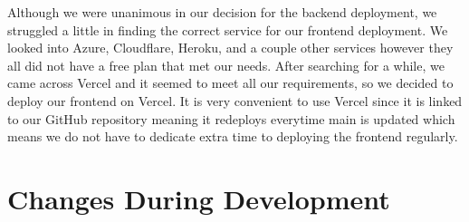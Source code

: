 Although we were unanimous in our decision for the backend deployment, we struggled a little in finding the correct service for our frontend deployment. We looked into Azure, Cloudflare, Heroku, and a couple other services however they all did not have a free plan that met our needs. After searching for a while, we came across Vercel and it seemed to meet all our requirements, so we decided to deploy our frontend on Vercel. It is very convenient to use Vercel since it is linked to our GitHub repository meaning it redeploys everytime main is updated which means we do not have to dedicate extra time to deploying the frontend regularly.



\section{Changes During Development}
\label{sect:changes-during-development}